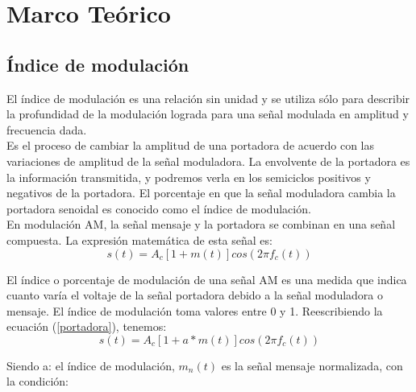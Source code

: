 \documentclass{article}
\author{Pablo Vivar Colina}
\begin{document}
\tableofcontents  %

\listoffigures  %


\section{Marco Teórico}

\subsection{Índice de modulación}

El índice de modulación es una relación sin unidad y se utiliza sólo para describir la profundidad de la modulación lograda para una señal modulada en amplitud y frecuencia dada.\citep{IndiceModulacion}\\

Es el proceso de cambiar la amplitud de una portadora de acuerdo con las variaciones de amplitud de la señal moduladora. La envolvente de la portadora es la información transmitida, y podremos verla en los semiciclos positivos y negativos de la portadora. El porcentaje en que la señal moduladora cambia la portadora senoidal es conocido como el
índice de modulación.\citep{IndiceModulacion}\\

En modulación AM, la señal mensaje y la portadora se combinan en una señal compuesta. La expresión matemática de esta señal es:\citep{IndiceModulacion}\\

\begin{equation}
    s(t)=A_c[1+m(t)]cos(2 \pi f_c(t))
    \label{portadora}
\end{equation}

El índice o porcentaje de modulación de una señal AM es una medida que indica cuanto varía el voltaje de la señal portadora debido a la señal moduladora o mensaje. El índice de modulación toma valores entre 0 y 1. Reescribiendo la ecuación (\ref{portadora}), tenemos:\citep{IndiceModulacion}\\


    \begin{equation}
    s(t)=A_c[1+a*m(t)]cos(2 \pi f_c(t))
    \label{portadoraPorA}
\end{equation}

Siendo a: el índice de modulación, $m_n(t)$ es la señal mensaje normalizada, con la condición:\citep{IndiceModulacion}\\
\end{document}
